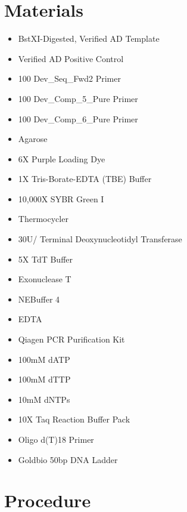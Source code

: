 \documentclass{ssiBio}
\begin{document}
\section{Materials}
\begin{itemize}
  \item{BstXI-Digested, Verified AD Template}
  \item{Verified AD Positive Control}
  \item{100\uM{} Dev\_Seq\_Fwd2 Primer}
  \item{100\uM{} Dev\_Comp\_5\_Pure Primer}
  \item{100\uM{} Dev\_Comp\_6\_Pure Primer}
  \item{Agarose}
  \item{6X Purple Loading Dye}
  \item{1X Tris-Borate-EDTA (TBE) Buffer}
  \item{10,000X SYBR Green I}
  \item{Thermocycler}
  \item{30U/\uL{} Terminal Deoxynucleotidyl Transferase}
  \item{5X TdT Buffer}
  \item{Exonuclease T}
  \item{NEBuffer 4}
  \item{EDTA}
  \item{Qiagen PCR Purification Kit}
  \item{100mM dATP}
  \item{100mM dTTP}
  \item{10mM dNTPs}
  \item{10X Taq Reaction Buffer Pack}
  \item{Oligo d(T)18 Primer}
  \item{Goldbio 50bp DNA Ladder}
\end{itemize}

\section{Procedure}
\end{document}
